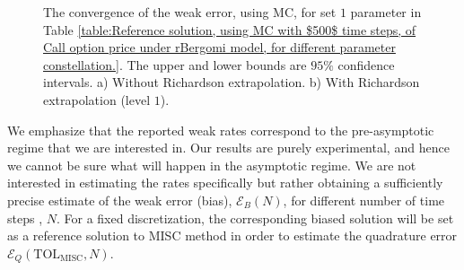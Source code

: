 \begin{figure}[h!]
	\caption{The  convergence of the weak error, using MC, for set $1$ parameter in Table \ref{table:Reference solution, using MC with $500$ time steps, of Call option price under rBergomi model, for different parameter constellation.}. The upper and lower bounds are $95\%$ confidence intervals. a) Without Richardson extrapolation.  b) With Richardson extrapolation (level $1$).}
	\label{fig:Weak_rate_set1_set_2_without_rich}
\end{figure}
\FloatBarrier




\begin{remark}
We emphasize that the reported weak rates correspond to the pre-asymptotic regime that we are interested in. Our results are purely experimental, and hence we cannot be sure what will happen in the asymptotic regime. We are not interested in estimating the rates specifically but rather obtaining  a sufficiently precise estimate of the weak error (bias), $\mathcal{E}_B(N)$, for different  number of time steps , $N$.  For a fixed discretization, the corresponding biased solution will be set as a reference solution to  MISC method  in order to estimate the quadrature error $\mathcal{E}_Q(\text{TOL}_{\text{MISC}},N)$.	
\end{remark}

%
%	

